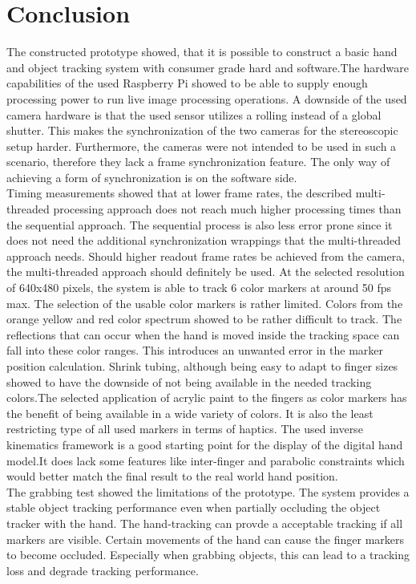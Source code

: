 \chapter{Conclusion}
The constructed prototype showed, that it is possible to construct a basic hand and object tracking system with consumer grade hard and software.The hardware capabilities of the used Raspberry Pi showed to be able to supply enough processing power to run live image processing operations. A downside of the used camera hardware is that the used sensor utilizes a rolling instead of a global shutter. This makes the synchronization of the two cameras for the stereoscopic setup harder. Furthermore, the cameras were not intended to be used in such a scenario, therefore they lack a frame synchronization feature. The only way of achieving a form of synchronization is on the software side.\\
Timing measurements showed that at lower frame rates, the described multi-threaded processing approach does not reach much higher processing times than the sequential approach. The sequential process is also less error prone since it does not need the additional synchronization wrappings that the multi-threaded approach needs. Should higher readout frame rates be achieved from the camera, the multi-threaded approach should definitely be used. At the selected resolution of 640x480 pixels, the system is able to track 6 color markers at around 50 fps max.
The selection of the usable color markers is rather limited. Colors from the orange yellow and red color spectrum showed to be rather difficult to track. The reflections that can occur when the hand is moved inside the tracking space can fall into these color ranges. This introduces an unwanted error in the marker position calculation.
Shrink tubing, although being easy to adapt to finger sizes showed to have the downside of not being available in the needed tracking colors.The selected application of acrylic paint to the fingers as color markers has the benefit of being available in a wide variety of colors. It is also the least restricting type of all used markers in terms of haptics.
The used inverse kinematics framework is  a good starting point for the display of the digital hand model.It does lack some features like inter-finger and parabolic constraints which would better match the final result to the real world hand position.\\
The grabbing test showed the limitations of the  prototype. The system provides a stable object tracking performance even when partially occluding the object tracker with the hand. The hand-tracking can provde a acceptable tracking if all markers are visible. Certain movements of the hand can cause the finger markers to become occluded. Especially when grabbing objects, this can lead to a tracking loss and degrade tracking performance.

